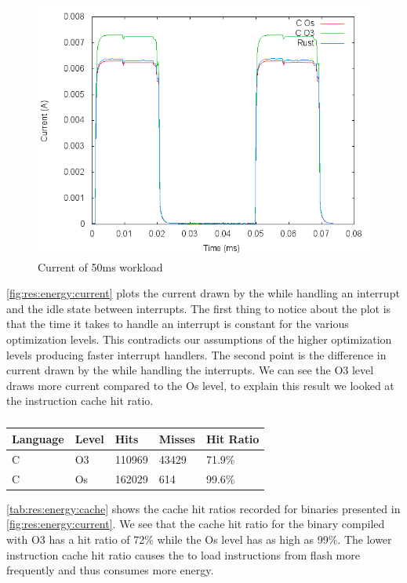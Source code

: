 \begin{figure}[H]
  \includegraphics[width=\textwidth]{results/plots/energy/irq/50.png}
  \caption{Current of 50ms workload}
  \label{fig:res:energy:current}
\end{figure}

\autoref{fig:res:energy:current} plots the current drawn by the {\gecko} while handling an interrupt and the idle state between interrupts.
The first thing to notice about the plot is that the time it takes to handle an interrupt is constant for the various optimization levels.
This contradicts our assumptions of the higher optimization levels producing faster interrupt handlers.
The second point is the difference in current drawn by the {\gecko} while handling the interrupts.
We can see the O3 level draws more current compared to the Os level, to explain this result we looked at the instruction cache hit ratio.

\begin{table}[H]
  \centering
  \begin{tabular}{l | l | l | l | l}
    \textbf{Language} & \textbf{Level} & \textbf{Hits} & \textbf{Misses} & \textbf{Hit Ratio} \\
    \hline
    C & O3 & 110969 & 43429 & 71.9\% \\
    C & Os & 162029 & 614 & 99.6\% \\
    \hline
  \end{tabular}
  \caption{}
  \label{tab:}
\end{table}

\autoref{tab:res:energy:cache} shows the cache hit ratios recorded for binaries presented in \autoref{fig:res:energy:current}.
We see that the cache hit ratio for the binary compiled with O3 has a hit ratio of 72\% while the Os level has as high as 99\%.
The lower instruction cache hit ratio causes the {\gecko} to load instructions from flash more frequently and thus consumes more energy.
